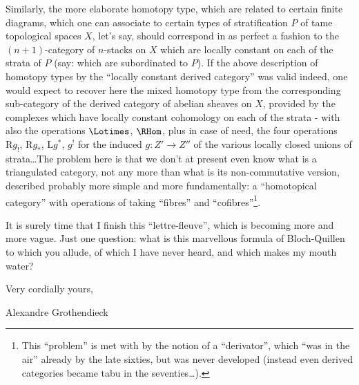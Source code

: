 Similarly, the more elaborate homotopy type, which are related to certain finite diagrams, which one can associate to certain types of stratification $P$ of tame topological spaces $X$, let's say, should correspond in as perfect a fashion to the $(n + 1)$-category of $n$-stacks on $X$ which are locally constant on each of the strata of $P$ (say: which are subordinated to $P$). If the above description of homotopy types by the ``locally constant derived category'' was valid indeed, one would expect to recover here the mixed homotopy type from the corresponding sub-category of the derived category of abelian sheaves on $X$, provided by the complexes which have locally constant cohomology on each of the strata - with also the operations $\Lotimes$, $\RHom$, plus in case of need, the four operations $\mathrm{R}g_!$, $\mathrm{R}g_*$, $\mathrm{L}g^*$, $g^!$ for the induced $g: Z' \to Z''$ of the various locally closed unions of strata\dots The problem here is that we don't at present even know what is a triangulated category, not any more than what is its non-commutative version, described probably more simple and more fundamentally: a ``homotopical category'' with operations of taking ``fibres'' and ``cofibres''\footnote{This ``problem'' is met with by the notion of a ``derivator'', which ``was in the air'' already by the late sixties, but was never developed (instead even derived categories became tabu in the seventies\dots).}.

It is surely time that I finish this ``lettre-fleuve'', which is becoming more and more vague. Just one question: what is this marvellous formula of Bloch-Quillen to which you allude, of which I have never heard, and which makes my mouth water?

\bigskip

Very cordially yours, 

\begin{flushright}
Alexandre Grothendieck
\end{flushright}











